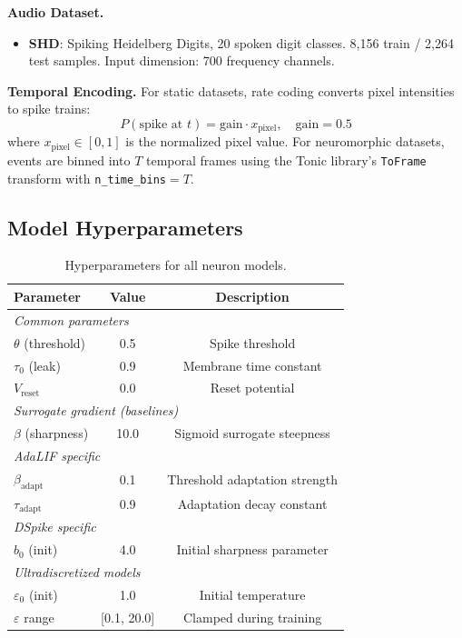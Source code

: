\documentclass{article}
\theoremstyle{plain}
\theoremstyle{definition}
\theoremstyle{remark}
\newcommand{\eps}{\varepsilon}
\begin{document}
\textbf{Audio Dataset.}
\begin{itemize}
    \item \textbf{SHD}: Spiking Heidelberg Digits, 20 spoken digit classes. 8,156 train / 2,264 test samples. Input dimension: 700 frequency channels.
\end{itemize}

\textbf{Temporal Encoding.} For static datasets, rate coding converts pixel intensities to spike trains:
\begin{equation}
P(\text{spike at } t) = \text{gain} \cdot x_{\text{pixel}}, \quad \text{gain} = 0.5
\end{equation}
where $x_{\text{pixel}} \in [0, 1]$ is the normalized pixel value. For neuromorphic datasets, events are binned into $T$ temporal frames using the Tonic library's \texttt{ToFrame} transform with \texttt{n\_time\_bins}${}=T$.

\subsection{Model Hyperparameters}

\begin{table}[h]
\caption{Hyperparameters for all neuron models.}
\label{tab:hyperparams}
\vskip 0.1in
\begin{center}
\begin{small}
\begin{tabular}{lcc}
\toprule
Parameter & Value & Description \\
\midrule
\multicolumn{3}{l}{\textit{Common parameters}} \\
$\theta$ (threshold) & 0.5 & Spike threshold \\
$\tau_0$ (leak) & 0.9 & Membrane time constant \\
$V_{\text{reset}}$ & 0.0 & Reset potential \\
\midrule
\multicolumn{3}{l}{\textit{Surrogate gradient (baselines)}} \\
$\beta$ (sharpness) & 10.0 & Sigmoid surrogate steepness \\
\midrule
\multicolumn{3}{l}{\textit{AdaLIF specific}} \\
$\beta_{\text{adapt}}$ & 0.1 & Threshold adaptation strength \\
$\tau_{\text{adapt}}$ & 0.9 & Adaptation decay constant \\
\midrule
\multicolumn{3}{l}{\textit{DSpike specific}} \\
$b_0$ (init) & 4.0 & Initial sharpness parameter \\
\midrule
\multicolumn{3}{l}{\textit{Ultradiscretized models}} \\
$\eps_0$ (init) & 1.0 & Initial temperature \\
$\eps$ range & [0.1, 20.0] & Clamped during training \\
\bottomrule
\end{tabular}
\end{small}
\end{center}
\vskip -0.1in
\end{table}
\end{document}
